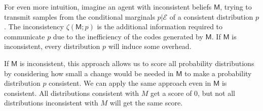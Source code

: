 \documentclass{article}
\newcommand{\bmu}{\boldsymbol{\mu}}
\newcommand{\Ed}{\mathcal E}
\newcommand{\sfM}{\mathsf M}
\numberwithin{equation}{section}
\begin{document}
	For even more intuition,
	imagine an agent with inconsistent beliefs $\sfM$, trying to
        transmit samples from the conditional marginals $p|\Ed$ of
        a consistent distribution $p$. The inconsistency
        $\zeta(\sfM;p)$ is the additional information required to
        communicate $p$ due to the inefficiency of the codes generated
        by $\sfM$. If $\sfM$ is inconsistent, every distribution $p$
        will induce some overhead. 



If $\sfM$ is inconsistent, this approach allows us to score all
probability distributions by considering how small a change would be
needed in $\sfM$ to make a probability distribution $p$ consistent. We
can apply the same approach even in $\sfM$ is consistent.  All
distributions consistent with $M$ get a score of 0, but not all
distributions inconsistent with $M$ will get the same score.
\end{document}
